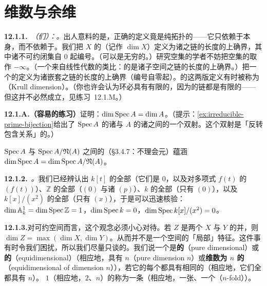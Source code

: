 
\section{维数与余维}

\textbf{12.1.1.}\ \emph{\trhDefinition{}（们）：\trDimension{}。}\quad 出人意料的是，正确的定义竟是纯拓扑的——它只依赖于\trTopologicalSpace{}本身，而不依赖于\trStructureSheaf。我们把\trTopologicalSpace{} $X$ 的\textbf{\trDimension}（记作 $\dim X$）定义为诸\trIrreducible{}\trClosedSet{}之链的长度的上确界，其中诸不可约闭集自 $0$ 起编号。（\trDimension{}可以是无穷的。）研究空集的学者不妨把空集的\trDimension{}取作 $-\infty$。（一个来自线性代数的类比：\trVectorSpace{}的\trDimension{}是诸子空间之链的长度的上确界。）把一个\trRing{}的\trDimension{}定义为诸嵌套\trPrimeIdeal{}之链的长度的上确界（编号自零起）。\trDimension{}的这两版定义有时被称为\textbf{\trKrullDimension}（Krull dimension）。（你也许会认为\trNoetherian{}环必具有有限的\trDimension{}，因为\trPrimeIdeal{}的链都是有限的——但这并不必然成立，见\mbox{练习~12.1.M}。）

\textbf{12.1.A.（容易的练习）}\quad 证明：$\dim\operatorname{Spec} A=\dim A$。（提示：\cref{ex:irreducible-prime-bijection}给出了 $\operatorname{Spec} A$ 的诸\trIrreducible{}\trClosedSubset{}与 $A$ 的诸\trPrimeIdeal{}之间的一个双射。这个双射是「反转包含关系」的。）

$\operatorname{Spec} A$ 与 $\operatorname{Spec} A/\mathfrak{N}(A)$ 之间的\trHomeomorphism{}（\S3.4.7：\trZariskiTopology{}不理会\trNilpotent{}元）蕴涵 $\dim\operatorname{Spec} A=\dim\operatorname{Spec} A/\mathfrak{N}(A)$。

\textbf{12.1.2.}\ \emph{\trhExample{}。}\quad 我们已经辨认出 $k[t]$ 的全部\trPrimeIdeal{}（它们是 $0$，以及对\trIrreducible{}多项式 $f(t)$ 的 $(f(t))$）、$\mathbb{Z}$ 的全部\trPrimeIdeal{}（$(0)$ 与诸 $(p)$）、$k$ 的全部\trPrimeIdeal{}（只有 $(0)$），以及 $k[x]/(x^2)$ 的全部\trPrimeIdeal{}（只有 $(x)$），于是可以迅速核验：$\dim\mathbb{A}^1_k=\dim\operatorname{Spec}\mathbb{Z}=1$，$\dim\operatorname{Spec} k=0$，$\dim\operatorname{Spec} k[x]/(x^2)=0$。

\textbf{12.1.3.}\quad 对可约空间而言，\trDimension{}这个观念必须小心对待。若 $Z$ 是两个\trClosedSubset{} $X$ 与 $Y$ 的并，则 $\dim Z=\max(\dim X,\dim Y)$。从而\trDimension{}并不是一个空间的「局部」特征。这件事有时令我们困扰，所以我们尽量只谈\trIrreducible{}\trTopologicalSpace{}的\trDimension。我们说一个\trTopologicalSpace{}是\textbf{\trPureDimensional{}的}（pure dimensional）或\textbf{\trEquidimensional{}的}（equidimensional）（相应地，具有\textbf{\trPureDimension{} $n$}（pure dimension $n$）或\textbf{维数为 $n$ 的\trEquidimensional}（equidimensional of dimension $n$）），若它的每个\trIrreducibleComponent{}都具有相同的\trDimension（相应地，它们全都具有\trDimension{} $n$）。\trPureDimension{} $1$（相应地，$2$、$n$）的\trTopologicalSpace{}称为一条\textbf{\trCurve}（相应地，一张\textbf{\trSurface}、一个\textbf{\trNFold}（$n$-fold））。

